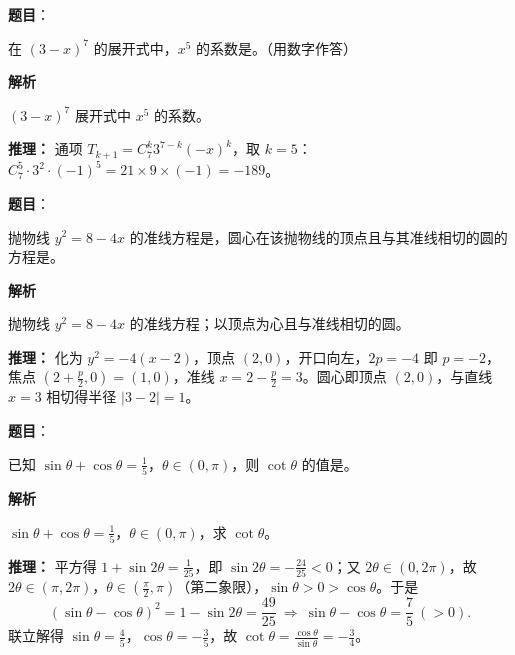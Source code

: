 \begin{answer}

\textbf{题目}：

在 $(3-x)^7$ 的展开式中，$x^5$ 的系数是\underline{\qquad\qquad}。（用数字作答）

\textbf{解析}

$(3-x)^7$ 展开式中 $x^5$ 的系数。

\textbf{推理：} 通项 $T_{k+1}=C_7^k3^{7-k}(-x)^k$，取 $k=5$：$C_7^5\cdot3^2\cdot(-1)^5=21\times9\times(-1)=-189$。


\end{answer}
\begin{answer}

\textbf{题目}：

抛物线 $y^2=8-4x$ 的准线方程是\underline{\qquad\qquad}，圆心在该抛物线的顶点且与其准线相切的圆的方程是\underline{\qquad\qquad}。

\textbf{解析}

抛物线 $y^2=8-4x$ 的准线方程；以顶点为心且与准线相切的圆。

\textbf{推理：} 化为 $y^2=-4(x-2)$，顶点 $(2,0)$，开口向左，$2p=-4$ 即 $p=-2$，焦点 $\left(2+\frac p2,0\right)=(1,0)$，准线 $x=2-\frac p2=3$。圆心即顶点 $(2,0)$，与直线 $x=3$ 相切得半径 $|3-2|=1$。


\end{answer}
\begin{answer}

\textbf{题目}：

已知 $\sin\theta+\cos\theta=\frac15$，$\theta\in(0,\pi)$，则 $\cot\theta$ 的值是\underline{\qquad\qquad}。

\textbf{解析}

$\sin\theta+\cos\theta=\frac15$，$\theta\in(0,\pi)$，求 $\cot\theta$。

\textbf{推理：} 平方得 $1+\sin2\theta=\frac1{25}$，即 $\sin2\theta=-\frac{24}{25}<0$；又 $2\theta\in(0,2\pi)$，故 $2\theta\in(\pi,2\pi)$，$\theta\in\left(\frac\pi2,\pi\right)$（第二象限），$\sin\theta>0>\cos\theta$。于是
\nopagebreak[4]
\[(\sin\theta-\cos\theta)^2=1-\sin2\theta=\frac{49}{25}\ \Rightarrow\ \sin\theta-\cos\theta=\frac75\ (>0).\]
联立解得 $\sin\theta=\frac45$，$\cos\theta=-\frac35$，故 $\cot\theta=\frac{\cos\theta}{\sin\theta}=-\frac34$。


\end{answer}
